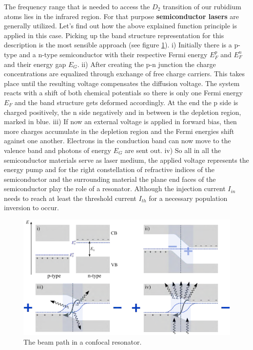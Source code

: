 The frequency range that is needed to access the $D_{2}$ transition of our rubidium atoms lies in the infrared region. For that purpose \textbf{semiconductor lasers} are generally utilized. Let's find out how the above explained function principle is applied in this case. Picking up the band structure representation for this description is the most sensible approach (see figure \ref{fig:Semiconlas.}). i) Initially there is a p-type and a n-type semiconductor with their respective Fermi energy $E^{p}_{F}$ and $E^{n}_{F}$ and their energy gap $E_{G}$. ii) After creating the p-n junction the charge concentrations are equalized through exchange of free charge carriers. This takes place until the resulting voltage compensates the diffusion voltage. The system reacts with a shift of both chemical potentials so there is only one Fermi energy $E_{F}$ and the band structure gets deformed accordingly. At the end the p side is charged positively, the n side negatively and in between is the depletion region, marked in blue. iii) If now an external voltage is applied in forward bias, then more charges accumulate in the depletion region and the Fermi energies shift against one another. Electrons in the conduction band can now move to the valence band and photons of energy $E_{G}$ are sent out. iv) So all in all the semiconductor materials serve as laser medium, the applied voltage represents the energy pump and for the right constellation of refractive indices of the semiconductor and the surrounding material the plane end faces of the semiconductor play the role of a resonator. Although the injection current $I_{in}$ needs to reach at least the threshold current $I_{th}$ for a necessary population inversion to occur.

\begin{figure}[h]
    \centering
    \includegraphics[width=15.8cm]{Semiconlas.png}
    \caption{The beam path in a confocal resonator.}
    \label{fig:Semiconlas.}
\end{figure}

